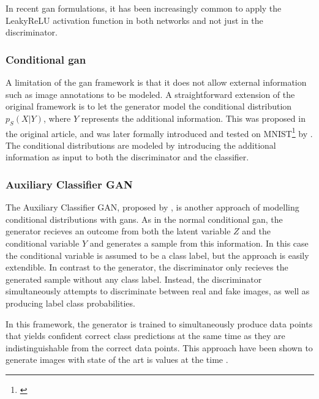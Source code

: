 In recent \acrshort{gan} formulations, it has been increasingly common to apply the LeakyReLU activation function in both networks and not just in the discriminator. 

\subsubsection{Conditional \acrshort{gan}}
A limitation of the \acrshort{gan} framework is that it does not allow external information such as image annotations to be modeled. A straightforward extension of the original framework is to let the generator model the conditional distribution $p_S(X|Y)$, where $Y$ represents the additional information. This was proposed in the original article, and was later formally introduced and tested on MNIST\footnote{\textcite{lecun2010mnist}} by \textcite{mirza2014conditional}. The conditional distributions are modeled by introducing the additional information as input to both the discriminator and the classifier.


\subsubsection{Auxiliary Classifier GAN}
The Auxiliary Classifier GAN, proposed by \textcite{odena2016conditional}, is another approach of modelling conditional distributions with \acrshort{gans}. As in the normal conditional \acrshort{gan}, the generator recieves an outcome from both the latent variable $Z$ and the conditional variable $Y$ and generates a sample from this information. In this case the conditional variable is assumed to be a class label, but the approach is easily extendible. In contrast to the generator, the discriminator only recieves the generated sample without any class label. Instead, the discriminator simultaneously attempts to discriminate between real and fake images, as well as producing label class probabilities.

In this framework, the generator is trained to simultaneously produce data points that yields confident correct class predictions at the same time as they are indistinguishable from the correct data points. This approach have been shown to generate images with state of the art \acrlong{is} values at the time \parencite{odena2016conditional}.


